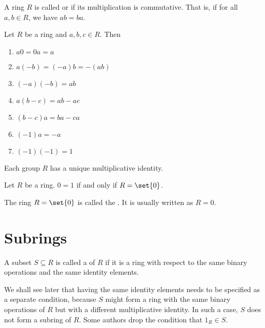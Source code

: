 \documentclass[11pt]{penrose}
\begin{document}
\begin{ndfn}
    A ring $R$ is called  or  if its multiplication is commutative. That is, if for all $a, b \in R$, we have $ab = ba$.
\end{ndfn}

\begin{nthm}
    Let $R$ be a ring and $a, b, c \in R$. Then
    \begin{enumerate}[label=(\roman*)]
        \item $a0 = 0a = a$
        \item $a(-b) = (-a)b = -(ab)$
        \item $(-a)(-b) = ab$
        \item $a(b-c) = ab - ac$
        \item $(b-c)a = ba - ca$
        \item $(-1)a = -a$
        \item $(-1)(-1) = 1$
    \end{enumerate}
\end{nthm}

\begin{nthm}
    Each group $R$ has a unique multiplicative identity.
\end{nthm}

\begin{nlemma}
    Let $R$ be a ring. $0 = 1$ if and only if $R = \set{0}$.
\end{nlemma}

\begin{ndfn}
    The ring $R = \set{0}$ is called the . It is usually written as $R = 0$.
\end{ndfn}


\section{Subrings}
\begin{ndfn}
    A subset $S \subseteq R$ is called a  of $R$ if it is a ring with respect to the same binary operations and the same identity elements.
\end{ndfn}

\begin{remark}
    We shall see later that having the same identity elements needs to be specified as a separate condition, because $S$ might form a ring with the same binary operations of $R$ but with a different multiplicative identity. In such a case, $S$ does not form a subring of $R$. Some authors drop the condition that $1_R \in S$.
\end{remark}
\end{document}

